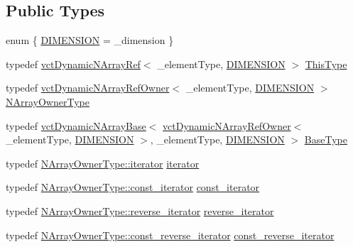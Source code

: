 \subsection*{Public Types}
\begin{DoxyCompactItemize}
\item 
enum \{ \hyperlink{group__cisst_vector_gga92161a3e7a42576d3442eaf7bae097c1aa639cdab72a595c9cb324af98946bab5}{D\+I\+M\+E\+N\+S\+I\+O\+N} = \+\_\+dimension
 \}
\item 
typedef \hyperlink{classvct_dynamic_n_array_ref}{vct\+Dynamic\+N\+Array\+Ref}$<$ \+\_\+element\+Type, \hyperlink{group__cisst_vector_gga92161a3e7a42576d3442eaf7bae097c1aa639cdab72a595c9cb324af98946bab5}{D\+I\+M\+E\+N\+S\+I\+O\+N} $>$ \hyperlink{classvct_dynamic_n_array_ref_a157266ffe0ad737f4df13dcf499a4494}{This\+Type}
\item 
typedef \hyperlink{classvct_dynamic_n_array_ref_owner}{vct\+Dynamic\+N\+Array\+Ref\+Owner}$<$ \+\_\+element\+Type, \hyperlink{group__cisst_vector_gga92161a3e7a42576d3442eaf7bae097c1aa639cdab72a595c9cb324af98946bab5}{D\+I\+M\+E\+N\+S\+I\+O\+N} $>$ \hyperlink{classvct_dynamic_n_array_ref_a64f8693e4cbab79b5b73e1e3a8620dca}{N\+Array\+Owner\+Type}
\item 
typedef \hyperlink{classvct_dynamic_n_array_base}{vct\+Dynamic\+N\+Array\+Base}$<$ \hyperlink{classvct_dynamic_n_array_ref_owner}{vct\+Dynamic\+N\+Array\+Ref\+Owner}$<$ \+\_\+element\+Type, \hyperlink{group__cisst_vector_gga92161a3e7a42576d3442eaf7bae097c1aa639cdab72a595c9cb324af98946bab5}{D\+I\+M\+E\+N\+S\+I\+O\+N} $>$, \+\_\+element\+Type, \hyperlink{group__cisst_vector_gga92161a3e7a42576d3442eaf7bae097c1aa639cdab72a595c9cb324af98946bab5}{D\+I\+M\+E\+N\+S\+I\+O\+N} $>$ \hyperlink{classvct_dynamic_n_array_ref_a05a9add95925f07f6bc955f7623f39d0}{Base\+Type}
\item 
typedef \hyperlink{classvct_dynamic_n_array_ref_owner_a9d68370074a5320a30354e700207ad71}{N\+Array\+Owner\+Type\+::iterator} \hyperlink{classvct_dynamic_n_array_ref_a790307f3b784640fd845e3a7f548374f}{iterator}
\item 
typedef \hyperlink{classvct_dynamic_n_array_ref_owner_ab6652472746656a9be2de178295fd80b}{N\+Array\+Owner\+Type\+::const\+\_\+iterator} \hyperlink{classvct_dynamic_n_array_ref_adcf4caa9e0d51a28f2baebabecc9a38b}{const\+\_\+iterator}
\item 
typedef \hyperlink{classvct_dynamic_n_array_ref_owner_aabd87b1efc3a18043c6dac3d8017be59}{N\+Array\+Owner\+Type\+::reverse\+\_\+iterator} \hyperlink{classvct_dynamic_n_array_ref_a94a5409f7d94313da64fc744ddd2b484}{reverse\+\_\+iterator}
\item 
typedef \hyperlink{classvct_dynamic_n_array_ref_owner_ade444e0883b2420a8a113171b6e49bf4}{N\+Array\+Owner\+Type\+::const\+\_\+reverse\+\_\+iterator} \hyperlink{classvct_dynamic_n_array_ref_acbbabce9e90157699716c48667704b2a}{const\+\_\+reverse\+\_\+iterator}
\end{DoxyCompactItemize}

